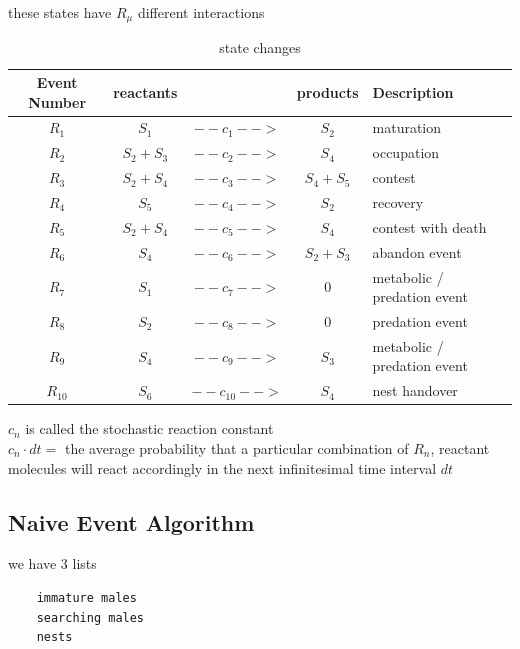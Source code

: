 \documentclass[a4paper,11pt]{article}
\begin{document}
these states have $R_\mu$ different interactions
\begin{table}[h!]
    \caption{state changes}
    \centering
    \begin{tabular}{c | c | c | c | l }
        \hline
            Event Number & reactants  & & products & Description\\
        \hline
        \hline
            $R_1$       &   $S_1$       & $--c_1-->$      &   $ S_2$      & maturation\\
            $R_2$       &   $S_2 + S_3$ & $--c_2-->$      &   $S_4 $      & occupation\\
            $R_3$       &   $S_2 + S_4$ & $--c_3-->$      &   $S_4 + S_5$ & contest\\
            $R_4$       &   $S_5$       & $--c_4-->$      &   $S_2$       & recovery\\
            $R_5$       &   $S_2 + S_4$ & $--c_5-->$      &   $S_4$       & contest with death\\
            $R_6$       &   $S_4$       & $--c_6-->$      &   $S_2 + S_3$ & abandon event\\
            $R_7$       &   $S_1$       & $--c_7-->$      &   $0$         & metabolic / predation event\\
            $R_8$       &   $S_2$       & $--c_8-->$      &   $0$         & predation event\\
            $R_9$       &   $S_4$       & $--c_9-->$      &   $S_3$       & metabolic / predation event\\
            $R_{10}$    &   $S_6$       & $--c_{10}-->$   &   $S_4$       & nest handover\\
        \hline
    \end{tabular}

\end{table}

$c_n$ is called the stochastic reaction constant\\
$c_n \cdot dt = $ the average probability that a particular combination of $R_n$, reactant molecules will react accordingly in the next infinitesimal time interval $dt$\\


\citep{Gillespie-1976}


\clearpage
\subsection{Naive Event Algorithm}
we have 3 lists
\begin{verbatim}
    immature males
    searching males
    nests
\end{verbatim}
\end{document}
